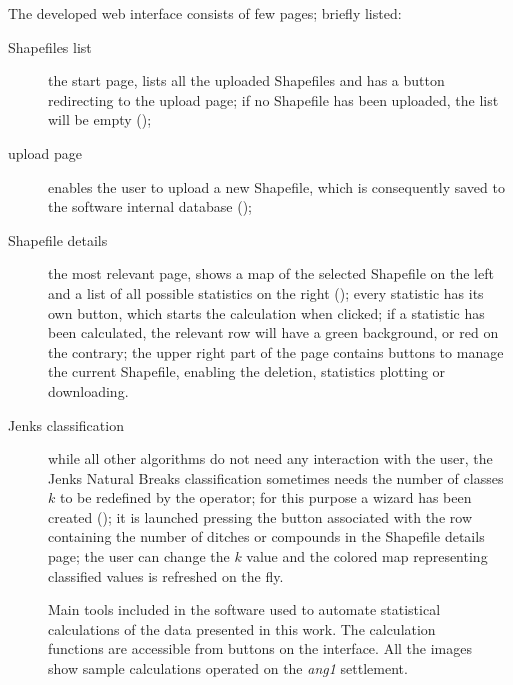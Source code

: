             The developed web interface consists of few pages; briefly listed:

            \begin{description}
                \item[Shapefiles list] the start page, lists all the uploaded Shapefiles and has a button redirecting to the upload page; if no Shapefile has been uploaded, the list will be empty ();
                \item[upload page] enables the user to upload a new Shapefile, which is consequently saved to the software internal database ();
                \item[Shapefile details] the most relevant page, shows a map of the selected Shapefile on the left and a list of all possible statistics on the right (); every statistic has its own button, which starts the calculation when clicked; if a statistic has been calculated, the relevant row will have a green background, or red on the contrary; the upper right part of the page contains buttons to manage the current Shapefile, enabling the deletion, statistics plotting or downloading.
                \item[Jenks classification] while all other algorithms do not need any interaction with the user, the Jenks Natural Breaks classification sometimes needs the number of classes $k$ to be redefined by the operator; for this purpose a wizard has been created (); it is launched pressing the button associated with the row containing the number of ditches or compounds in the Shapefile details page; the user can change the $k$ value and the colored map representing classified values is refreshed on the fly.
            \end{description}

            \pagebreak

            \vfill

            \begin{figure}[H]
                \caption[Screenshots of the main tools of the software created to automate statistical calculations.]{Main tools included in the software used to automate statistical calculations of the data presented in this work. The calculation functions are accessible from buttons on the interface. All the images show sample calculations operated on the \emph{ang1} settlement.}
                \label{fig:screenshots}
            \end{figure}


